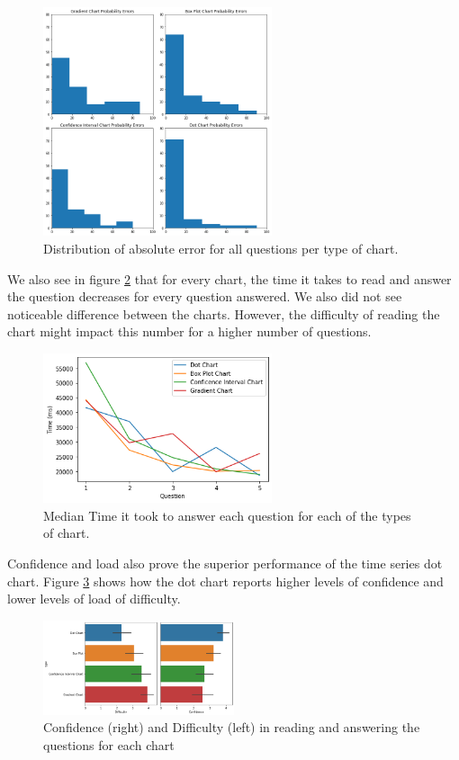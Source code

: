 \documentclass[a4paper,3p,sort&compress]{elsarticle}
\begin{document}
\begin{figure}
  \centering
  \includegraphics[width=0.6\textwidth]{probability_errors}
  \caption{\label{figure:errors}Distribution of absolute error for all questions per type of chart.}
\end{figure}

We also see in figure \ref{figure:duration} that for every chart, the time it takes to read and answer the question decreases for every question answered. We also did not see noticeable difference between the charts. However, the difficulty of reading the chart might impact this number for a higher number of questions.

\begin{figure}
  \centering
   \includegraphics[width=0.6\textwidth]{duration_evo}
  \caption{\label{figure:duration} Median Time it took to answer each question for each of the types of chart.}
\end{figure}  

Confidence and load also prove the superior performance of the time series dot chart. Figure \ref{figure:confi_load} shows how the dot chart reports higher levels of confidence and lower levels of load of difficulty.

\begin{figure}
  \centering
   \includegraphics[width=0.5\textwidth]{confi_load}
  \caption{\label{figure:confi_load}Confidence (right) and Difficulty (left) in reading and answering the questions for each chart}
\end{figure}
\end{document}
